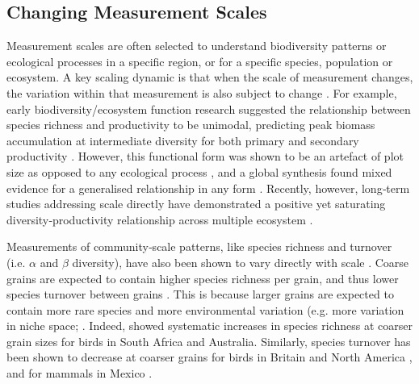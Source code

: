 \subsection{Changing Measurement Scales}

Measurement scales are often selected to understand biodiversity patterns or ecological processes in a specific region, or for a specific species, population or ecosystem. A key scaling dynamic is that when the scale of measurement changes, the variation within that measurement is also subject to change \cite{Wiens1989-yi,Levin1992-ga}. For example, early biodiversity/ecosystem function research suggested the relationship between species richness and productivity to be unimodal, predicting peak biomass accumulation at intermediate diversity for both primary and secondary productivity \cite{Rosenzweig1993-mo}. However, this functional form was shown to be an artefact of plot size as opposed to any ecological process \cite{Oksanen1996-bx}, and a global synthesis found mixed evidence for a generalised relationship in any form \cite{Adler2011-zc}. Recently, however, long‐term studies addressing scale directly have demonstrated a positive yet saturating diversity‐productivity relationship across multiple ecosystem \cite{Liang2016-dv,Hungate2017-ax}.

Measurements of community‐scale patterns, like species richness and turnover (i.e. $\alpha$ and $\beta$ diversity), have also been shown to vary directly with scale \cite{Rosenzweig1995-hc}. Coarse grains are expected to contain higher species richness per grain, and thus lower species turnover between grains \cite{Nekola1999-ks,Whittaker2001-lw}. This is because larger grains are expected to contain more rare species and more environmental variation (e.g. more variation in niche space; \cite{Keil2015-nl}. Indeed, \cite{Hurlbert2007-dc} showed systematic increases in species richness at coarser grain sizes for birds in South Africa and Australia. Similarly, species turnover has been shown to decrease at coarser grains for birds in Britain and North America \cite{Mac_Nally2004-ly,Gaston2007-yf}, and for mammals in Mexico \cite{Arita2002-jk}.

